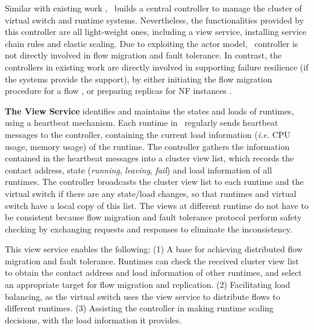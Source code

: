 Similar with existing work \cite{gember2015opennf, palkar2015e2, sherry2015rollback}, \nfactor~builds a central controller to manage the cluster of virtual switch and runtime systems. Nevertheless, the functionalities provided by this controller are all light-weight ones, including a view service, installing service chain rules and elastic scaling. Due to exploiting the actor model, \nfactor~controller is not directly involved in flow migration and fault tolerance. In contrast, the controllers in existing work are directly involved in supporting failure resilience (if the systems provide the support), by either initiating the flow migration procedure for a flow \cite{gember2015opennf}, or preparing replicas for NF instances \cite{sherry2015rollback}. 


\textbf{The View Service} identifies and maintains the states and loads of runtimes, using a heartbeat mechanism. Each runtime in \nfactor~regularly sends heartbeat messages to the controller, containing the current load information (\textit{i.e.} CPU usage, memory usage) of the runtime. The controller gathers the information contained in the heartbeat messages into a cluster view list, which records the contact address, state (\textit{running}, \textit{leaving}, \textit{fail}) and load information of all runtimes. The controller broadcasts the cluster view list to each runtime and the virtual switch if there are any state/load changes, so that runtimes and virtual switch have a local copy of this list. The views at different runtime do not have to be consistent because flow migration and fault tolerance protocol perform safety checking by exchanging requests and responses to eliminate the inconsistency. %

This view service enables the following: (1) A base for achieving distributed flow migration and fault tolerance. Runtimes can check the received cluster view list to obtain the contact address and load information of other runtimes, and select an appropriate target for flow migration and replication. (2) Facilitating load balancing, as the virtual switch uses the view service to distribute flows to different runtimes. (3) Assisting the controller in making runtime scaling decisions, with the load information it provides.

